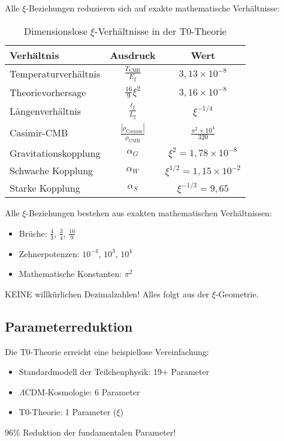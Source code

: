 \documentclass[12pt,a4paper]{article}
\theoremstyle{definition}
\theoremstyle{remark}
\begin{document}
	Alle $\xi$-Beziehungen reduzieren sich auf exakte mathematische Verh\"altnisse:
	
	\begin{table}[htbp]
		\centering
		\caption{Dimensionslose $\xi$-Verh\"altnisse in der T0-Theorie}
		\begin{tabular}{lcc}
			\toprule
			\textbf{Verh\"altnis} & \textbf{Ausdruck} & \textbf{Wert} \\
			\midrule
			Temperaturverh\"altnis & $\frac{T_{\text{CMB}}}{E_\xi}$ & $3,13 \times 10^{-8}$ \\
			Theorievorhersage & $\frac{16}{9}\xi^2$ & $3,16 \times 10^{-8}$ \\
			L\"angenverh\"altnis & $\frac{\ell_{\xi}}{L_\xi}$ & $\xi^{-1/4}$ \\
			Casimir-CMB & $\frac{|\rho_{\text{Casimir}}|}{\rho_{\text{CMB}}}$ & $\frac{\pi^2 \times 10^4}{320}$ \\
			Gravitationskopplung & $\alpha_G$ & $\xi^2 = 1,78 \times 10^{-8}$ \\
			Schwache Kopplung & $\alpha_W$ & $\xi^{1/2} = 1,15 \times 10^{-2}$ \\
			Starke Kopplung & $\alpha_S$ & $\xi^{-1/3} = 9,65$ \\
			\bottomrule
		\end{tabular}
	\end{table}
	
	\begin{important}
		Alle $\xi$-Beziehungen bestehen aus exakten mathematischen Verh\"altnissen:
		\begin{itemize}
			\item Br\"uche: $\frac{4}{3}$, $\frac{3}{4}$, $\frac{16}{9}$
			\item Zehnerpotenzen: $10^{-4}$, $10^3$, $10^4$
			\item Mathematische Konstanten: $\pi^2$
		\end{itemize}
		KEINE willk\"urlichen Dezimalzahlen! Alles folgt aus der $\xi$-Geometrie.
	\end{important}
	
	\subsection{Parameterreduktion}
	
	\begin{revolutionary}
		Die T0-Theorie erreicht eine beispiellose Vereinfachung:
		\begin{itemize}
			\item Standardmodell der Teilchenphysik: 19+ Parameter
			\item $\Lambda$CDM-Kosmologie: 6 Parameter
			\item T0-Theorie: 1 Parameter ($\xi$)
		\end{itemize}
		96\% Reduktion der fundamentalen Parameter!
	\end{revolutionary}
	
\end{document}
